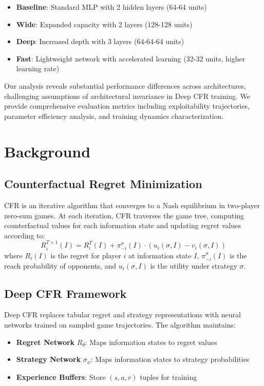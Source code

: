\documentclass{article}
\begin{document}
\begin{itemize}
\item \textbf{Baseline}: Standard MLP with 2 hidden layers (64-64 units)
\item \textbf{Wide}: Expanded capacity with 2 layers (128-128 units)
\item \textbf{Deep}: Increased depth with 3 layers (64-64-64 units)
\item \textbf{Fast}: Lightweight network with accelerated learning (32-32 units, higher learning rate)
\end{itemize}

Our analysis reveals substantial performance differences across architectures, challenging assumptions of architectural invariance in Deep CFR training. We provide comprehensive evaluation metrics including exploitability trajectories, parameter efficiency analysis, and training dynamics characterization.

\section{Background}

\subsection{Counterfactual Regret Minimization}

CFR is an iterative algorithm that converges to a Nash equilibrium in two-player zero-sum games. At each iteration, CFR traverses the game tree, computing counterfactual values for each information state and updating regret values according to:
\[
R_i^{T+1}(I) = R_i^T(I) + \pi_{-i}^{\sigma}(I) \cdot (u_i(\sigma, I) - v_i(\sigma, I))
\]
where $R_i(I)$ is the regret for player $i$ at information state $I$, $\pi_{-i}^{\sigma}(I)$ is the reach probability of opponents, and $u_i(\sigma, I)$ is the utility under strategy $\sigma$.

\subsection{Deep CFR Framework}

Deep CFR replaces tabular regret and strategy representations with neural networks trained on sampled game trajectories. The algorithm maintains:

\begin{itemize}
\item \textbf{Regret Network} $R_\theta$: Maps information states to regret values
\item \textbf{Strategy Network} $\sigma_\phi$: Maps information states to strategy probabilities
\item \textbf{Experience Buffers}: Store $(s, a, r)$ tuples for training
\end{itemize}
\end{document}
